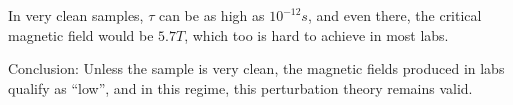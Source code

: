 \documentclass{report}
\begin{document}
In very clean samples, $\tau$ can be as high as $10^{-12} s$, and even there, the critical magnetic field would be  $5.7 T$, which too is hard to achieve in most labs.

Conclusion: Unless the sample is very clean, the magnetic fields produced in labs qualify as ``low'', and in this regime, this perturbation theory remains valid.

%
\printbibliography
\end{document}
